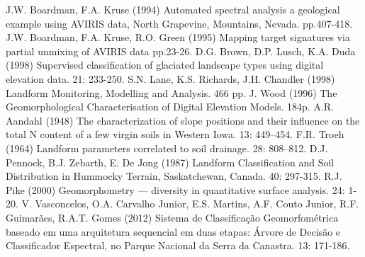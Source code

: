 \begin{footnotesize}
\begin{thebibliography}{99}
J.W. Boardman, F.A. Kruse (1994)
\newblock Automated  spectral analysis a geological example using AVIRIS data, North Grapevine, Mountains, Nevada.
 pp.407-418.
J.W. Boardman, F.A. Kruse, R.O. Green (1995)
\newblock Mapping target signatures via partial unmixing of AVIRIS data
 pp.23-26.
D.G. Brown, D.P. Lusch, K.A. Duda (1998)
\newblock Supervised classification of glaciated landscape types using digital elevation data.
 21: 233-250.
S.N. Lane, K.S. Richards, J.H. Chandler (1998)
\newblock Landform Monitoring, Modelling and Analysis.
 466 pp.
J. Wood (1996)
\newblock The  Geomorphological  Characterisation of Digital Elevation Models.
 184p.
A.R. Aandahl (1948)
\newblock The characterization of slope positions and their influence on the total N content of a few virgin soils in Western Iowa.
 13: 449–454.
F.R. Troeh (1964)
\newblock Landform parameters correlated to soil drainage.
 28: 808–812.
D.J. Pennock, B.J. Zebarth, E. De Jong (1987)
\newblock Landform  Classification  and  Soil Distribution in Hummocky Terrain, Saskatchewan, Canada.
 40: 297-315.
R.J. Pike (2000)
\newblock Geomorphometry — diversity in quantitative surface analysis.
 24: 1-20.
V. Vasconcelos, O.A. Carvalho Junior, E.S. Martins, A.F. Couto Junior, R.F. Guimarães, R.A.T. Gomes (2012)
\newblock Sistema de Classificação Geomorfométrica baseado em uma arquitetura sequencial em duas etapas: Árvore de Decisão e Classificador Espectral, no Parque Nacional da Serra da Canastra.
 13: 171-186.
\end{thebibliography}
\end{footnotesize}
\address{Vinicius Vasconcelos\\
  Universidade de Brasília\\
  }
